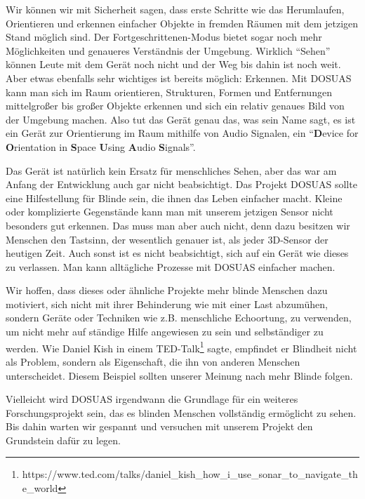 \documentclass[a4paper,12pt,ngerman]{scrartcl}
\begin{document}
Wir können wir mit Sicherheit sagen, dass erste Schritte wie das Herumlaufen, Orientieren und erkennen einfacher
Objekte in fremden Räumen mit dem jetzigen Stand möglich sind. Der Fortgeschrittenen-Modus bietet sogar noch mehr 
Möglichkeiten und genaueres Verständnis der Umgebung.
Wirklich \enquote{Sehen} können Leute mit dem Gerät noch nicht und der Weg bis dahin ist noch weit.
Aber etwas ebenfalls sehr wichtiges
ist bereits möglich: Erkennen. Mit DOSUAS kann man sich im Raum orientieren, Strukturen, Formen und Entfernungen
mittelgroßer bis großer Objekte erkennen und sich ein relativ genaues Bild von der Umgebung machen. 
Also tut das Gerät genau das, was sein Name sagt, es ist ein Gerät zur Orientierung im Raum mithilfe von Audio
Signalen, ein \enquote{\textbf{D}evice for \textbf{O}rientation in \textbf{S}pace \textbf{U}sing 
	\textbf{A}udio \textbf{S}ignals}.\par 
Das Gerät ist natürlich kein Ersatz für menschliches Sehen, aber das war am Anfang der Entwicklung
auch gar nicht beabsichtigt. Das Projekt DOSUAS sollte eine Hilfestellung für Blinde sein, die ihnen das Leben einfacher macht. Kleine oder komplizierte Gegenstände kann man mit unserem jetzigen Sensor nicht besonders gut erkennen. Das muss man aber auch nicht, denn dazu besitzen wir Menschen den Tastsinn, der wesentlich genauer ist,
als jeder 3D-Sensor der heutigen Zeit. Auch sonst ist es nicht beabsichtigt, sich auf 
ein Gerät wie dieses zu verlassen. Man kann alltägliche Prozesse mit DOSUAS einfacher machen.\par
Wir hoffen, dass dieses oder ähnliche Projekte mehr blinde Menschen dazu motiviert, sich nicht 
mit ihrer Behinderung wie mit einer Last abzumühen, sondern Geräte oder Techniken
wie z.B. menschliche Echoortung, zu verwenden, um nicht mehr auf ständige Hilfe angewiesen 
zu sein und selbständiger zu werden. Wie Daniel Kish in einem TED-Talk\footnote{https://www.ted.com/talks/daniel\_kish\_how\_i\_use\_sonar\_to\_navigate\_the\_world} sagte, 
empfindet er Blindheit nicht als Problem, sondern als Eigenschaft, die ihn von anderen Menschen
unterscheidet. Diesem Beispiel sollten unserer Meinung nach mehr Blinde folgen.\par 
Vielleicht wird DOSUAS irgendwann die Grundlage für ein weiteres
Forschungsprojekt sein, das es blinden Menschen vollständig ermöglicht zu sehen. Bis dahin
warten wir gespannt und versuchen mit unserem Projekt den Grundstein dafür zu legen. 

\newpage
\end{document}
